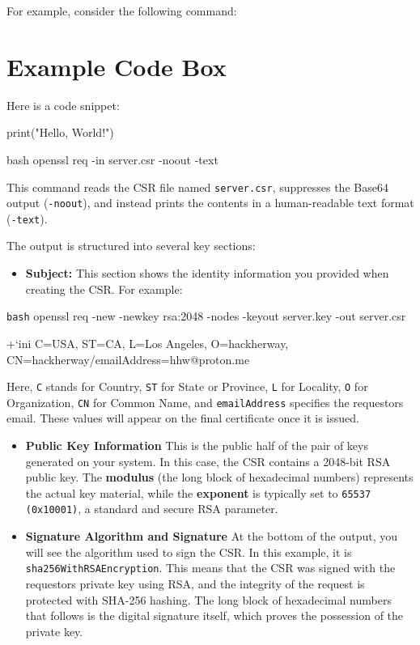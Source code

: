 For example, consider the following command:
\section*{Example Code Box}

Here is a code snippet:

    print("Hello, World!")



bash
openssl req -in server.csr -noout -text

This command reads the CSR file named \verb|server.csr|, suppresses the Base64 output (\verb|-noout|), and instead prints the contents in a human-readable text format (\verb|-text|).

The output is structured into several key sections:

\begin{itemize}
    \item \textbf{Subject:} This section shows the identity information you provided when creating the CSR. For example:
\end{itemize}
\begin{codeblock}{\texttt{bash}}
openssl req -new -newkey rsa:2048 -nodes -keyout server.key -out server.csr
\end{codeblock}



+`ini
C=USA, ST=CA, L=Los Angeles, O=hackherway, CN=hackherway/emailAddress=hhw@proton.me

 
Here, \verb|C| stands for Country, \verb|ST| for State or Province, \verb|L| for Locality, \verb|O| for Organization, \verb|CN| for Common Name, and \verb|emailAddress| specifies the requestors email. These values will appear on the final certificate once it is issued.
\begin{itemize}
    \item \textbf{Public Key Information}
        This is the public half of the pair of keys generated on your system. In this case, the CSR contains a 2048-bit RSA public key. The \textbf{modulus} (the long block of hexadecimal numbers) represents the actual key material, while the \textbf{exponent} is typically set to \verb|65537 (0x10001)|, a standard and secure RSA parameter.
    \item \textbf{Signature Algorithm and Signature}
        At the bottom of the output, you will see the algorithm used to sign the CSR. In this example, it is \verb|sha256WithRSAEncryption|. This means that the CSR was signed with the requestors private key using RSA, and the integrity of the request is protected with SHA-256 hashing. The long block of hexadecimal numbers that follows is the digital signature itself, which proves the possession of the private key.
\end{itemize}

